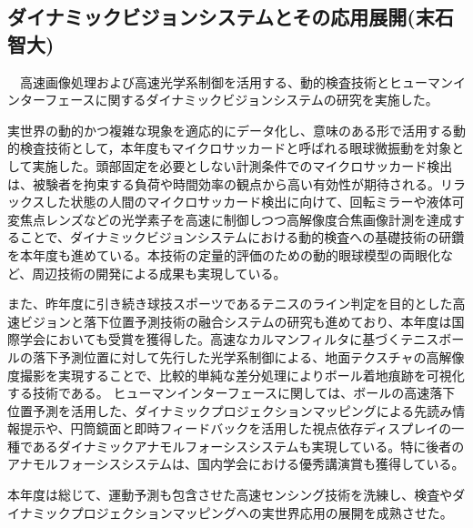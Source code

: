 \subsection{ダイナミックビジョンシステムとその応用展開(末石智大)}

　高速画像処理および高速光学系制御を活用する、動的検査技術とヒューマンインターフェースに関するダイナミックビジョンシステムの研究を実施した。

実世界の動的かつ複雑な現象を適応的にデータ化し、意味のある形で活用する動的検査技術として，本年度もマイクロサッカードと呼ばれる眼球微振動を対象として実施した。頭部固定を必要としない計測条件でのマイクロサッカード検出は、被験者を拘束する負荷や時間効率の観点から高い有効性が期待される。リラックスした状態の人間のマイクロサッカード検出に向けて、回転ミラーや液体可変焦点レンズなどの光学素子を高速に制御しつつ高解像度合焦画像計測を達成することで、ダイナミックビジョンシステムにおける動的検査への基礎技術の研鑽を本年度も進めている。本技術の定量的評価のための動的眼球模型の両眼化など、周辺技術の開発による成果も実現している。

また、昨年度に引き続き球技スポーツであるテニスのライン判定を目的とした高速ビジョンと落下位置予測技術の融合システムの研究も進めており、本年度は国際学会においても受賞を獲得した。高速なカルマンフィルタに基づくテニスボールの落下予測位置に対して先行した光学系制御による、地面テクスチャの高解像度撮影を実現することで、比較的単純な差分処理によりボール着地痕跡を可視化する技術である。
ヒューマンインターフェースに関しては、ボールの高速落下位置予測を活用した、ダイナミックプロジェクションマッピングによる先読み情報提示や、円筒鏡面と即時フィードバックを活用した視点依存ディスプレイの一種であるダイナミックアナモルフォーシスシステムも実現している。特に後者のアナモルフォーシスシステムは、国内学会における優秀講演賞も獲得している。

本年度は総じて、運動予測も包含させた高速センシング技術を洗練し、検査やダイナミックプロジェクションマッピングへの実世界応用の展開を成熟させた。
